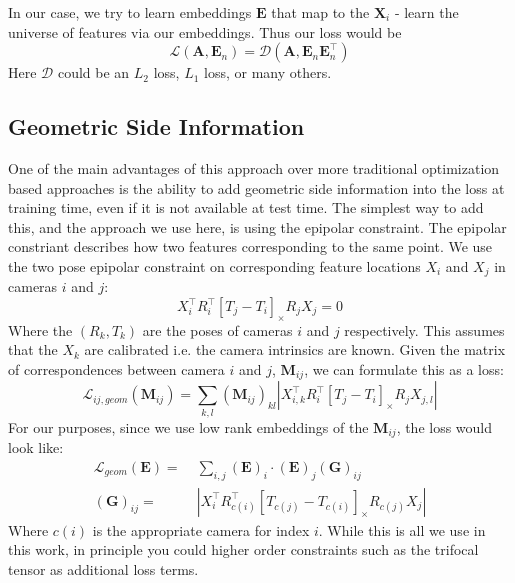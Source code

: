\documentclass[10pt,twocolumn,letterpaper]{article}
\newcommand{\mat}[1]{\mathbf{#1}}
\newcommand{\cross}[1]{[#1]_{\times}}
\begin{document}
In our case, we try to learn embeddings $\mat{E}$ that map to the $\mat{X}_i$ - learn the universe of features via our embeddings.
Thus our loss would be 
\begin{equation}
\mathcal{L}(\mat{A}, \mat{E}_n) = \mathcal{D}(\mat{A}, \mat{E}_n\mat{E}_n^\top)
\end{equation}
Here $\mathcal{D}$ could be an $L_2$ loss, $L_1$ loss, or many others. 

\subsection{Geometric Side Information}
One of the main advantages of this approach over more traditional optimization based approaches is the ability to add geometric side information into the loss at training time, even if it is not available at test time.
The simplest way to add this, and the approach we use here, is using the epipolar constraint.
The epipolar constriant describes how two features corresponding to the same point.
We use the two pose epipolar constraint \cite{tron2014quotient} on corresponding feature locations $X_i$ and $X_j$ in cameras $i$ and $j$:
\begin{equation}
X_{i}^\top R_{i}^\top \cross{T_{j} - T_{i}}R_{j} X_{j} = 0
\label{eq:essential_constraint}
\end{equation}
Where the $(R_k, T_k)$ are the poses of cameras $i$ and $j$ respectively.
This assumes that the $X_k$ are calibrated i.e. the camera intrinsics are known. 
Given the matrix of correspondences between camera $i$ and $j$, $\mat{M}_{ij}$, we can formulate this as a loss:
\begin{equation}
\mathcal{L}_{ij,geom}(\mat{M}_{ij}) = \sum_{k,l} (\mat{M}_{ij})_{kl} \left|X_{i,k}^\top R_{i}^\top \cross{T_{j} - T_{i}}R_{j} X_{j,l}\right|
\label{eq:geom_cost}
\end{equation}
For our purposes, since we use low rank embeddings of the $\mat{M}_{ij}$, the loss would look like:
\begin{align}
\mathcal{L}_{geom}(\mat{E}) =&\; \sum_{i,j} (\mat{E})_{i} \cdot (\mat{E})_{j} (\mat{G})_{ij} \\
(\mat{G})_{ij} =&\; \left|X_{i}^\top R_{c(i)}^\top \cross{T_{c(j)} - T_{c(i)}}R_{c(j)} X_{j}\right| \nonumber
\label{eq:geom_cost2}
\end{align}
Where $c(i)$ is the appropriate camera for index $i$.
While this is all we use in this work, in principle you could higher order constraints such as the trifocal tensor as additional loss terms.
\end{document}
